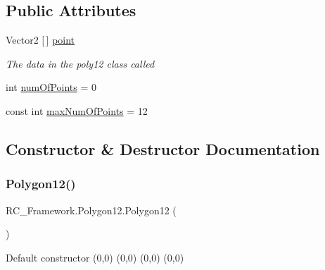 \subsection*{Public Attributes}
\begin{DoxyCompactItemize}
\item 
Vector2 \mbox{[}$\,$\mbox{]} \mbox{\hyperlink{class_r_c___framework_1_1_polygon12_a4579622849fdf2d01c9f40b54dfe3f04}{point}}
\begin{DoxyCompactList}\small\item\em The data in the poly12 class called \end{DoxyCompactList}\item 
int \mbox{\hyperlink{class_r_c___framework_1_1_polygon12_abe72eb58151bde5aba872ae5653445b8}{num\+Of\+Points}} = 0
\item 
const int \mbox{\hyperlink{class_r_c___framework_1_1_polygon12_a2ad1aadef9d62f58a113524d8d9aa48e}{max\+Num\+Of\+Points}} = 12
\end{DoxyCompactItemize}


\subsection{Constructor \& Destructor Documentation}
\mbox{\label{class_r_c___framework_1_1_polygon12_aec7781453e11e5b0be7574d23010ac07}} 
\subsubsection{\texorpdfstring{Polygon12()}{Polygon12()}\hspace{0.1cm}{\footnotesize\ttfamily [1/5]}}
{\footnotesize\ttfamily R\+C\+\_\+\+Framework.\+Polygon12.\+Polygon12 (\begin{DoxyParamCaption}{ }\end{DoxyParamCaption})}



Default constructor (0,0) (0,0) (0,0) (0,0)

\mbox{\label{class_r_c___framework_1_1_polygon12_a178f002cc94e9183d9c3c9e9c919d7fb}} 
